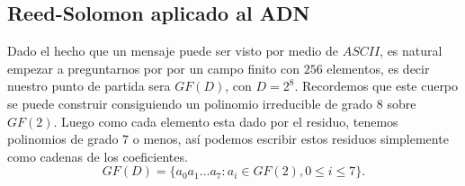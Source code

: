 
\subsection{Reed-Solomon aplicado al ADN}
Dado el hecho que un mensaje puede ser visto por medio de $ASCII$, es natural empezar a preguntarnos por por un campo finito con $256$ elementos, es decir nuestro punto de partida sera $GF(D)$, con $D=2^8.$ Recordemos que este cuerpo se puede construir consiguiendo un polinomio irreducible de grado $8$ sobre $GF(2)$. Luego como cada elemento esta dado por el residuo, tenemos polinomios de grado $7$ o menos, así podemos escribir estos residuos simplemente como cadenas de los coeficientes.
$$GF(D)=\{a_0a_1\ldots a_7: a_i\in GF(2), 0\leq i\leq 7\}.$$